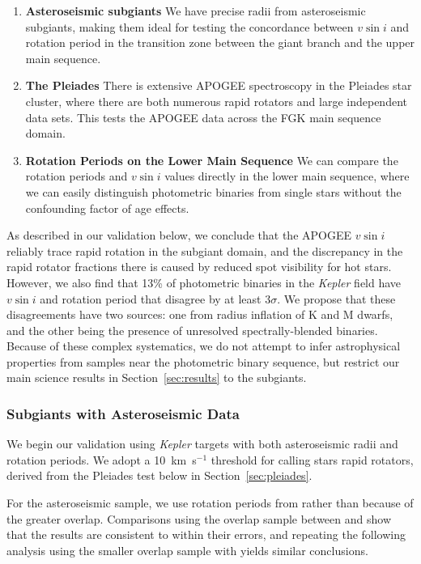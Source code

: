 \documentclass[preprint2]{aastex62}
\newcommand{\vsini}{\ensuremath{v \sin i}}
\newcommand{\Kepler}{\mbox{\textit{Kepler}}}
\newcommand{\kms}{\textrm{km~s}\ensuremath{^{-1}}}
\begin{document}
\begin{enumerate}
    \item \textbf{Asteroseismic subgiants} We have precise radii from
        asteroseismic subgiants, making them ideal for testing the concordance
        between \vsini{} and rotation period in the transition zone between the
        giant branch and the upper main sequence.
    \item \textbf{The Pleiades} There is extensive APOGEE spectroscopy in the
        Pleiades star cluster, where there are both numerous rapid rotators and
        large independent data sets. This tests the APOGEE data across the FGK
        main sequence domain.
    \item \textbf{Rotation Periods on the Lower Main Sequence} We can compare
        the rotation periods and \vsini{} values directly in the lower main
        sequence, where we can easily distinguish photometric binaries from
        single stars without the confounding factor of age effects.
\end{enumerate}

As described in our validation below, we conclude that the APOGEE
\vsini{} reliably trace rapid rotation in the subgiant domain, and the
discrepancy in the rapid rotator fractions there is caused by reduced spot 
visibility for hot stars. However, we also find that 13\% of photometric binaries in the \Kepler{} field
have \vsini{} and rotation period that
disagree by at least \(3\sigma\). We 
propose that these disagreements have two sources: one from radius inflation of 
K and M dwarfs, and the other being the presence of unresolved 
spectrally-blended binaries. Because of these
complex systematics, we do not attempt to infer astrophysical properties from
samples near the photometric binary sequence, but restrict our
main science results in Section~\ref{sec:results} to the subgiants.

 
\subsubsection{Subgiants with Asteroseismic Data}
\label{sec:rotcomp}

We begin our validation using \Kepler{} targets with both asteroseismic radii
and rotation periods. We adopt a 10~\kms{} threshold for calling stars rapid
rotators, derived from the Pleiades test below in Section~\ref{sec:pleiades}.

For the asteroseismic sample, we use rotation periods from \citet{Garcia14}
rather than \citet{McQuillan14} because of the greater overlap. Comparisons
using the overlap sample between \citet{McQuillan14} and \citet{Garcia14} show
that the results are consistent to within their errors, and repeating the
following analysis using the smaller overlap sample with \citet{McQuillan14}
yields similar conclusions.
\end{document}
